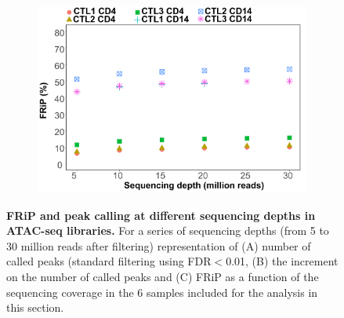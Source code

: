 \begin{figure}[htbp]
\begin{subfigure}{0.45\textwidth}
\includegraphics[width=\textwidth]{./Results1/pdfs/ATAC_Core_fresh_CD4_CD14_frac_reads_in_peaks_vs_depth}
\caption{\textbf{}}
\end{subfigure}
\caption[FRiP and peak calling at different sequencing depths in ATAC-seq libraries.]{\textbf{FRiP and peak calling at different sequencing depths in ATAC-seq libraries.} For a series of sequencing depths (from 5 to 30 million reads after filtering) representation of (A) number of called peaks (standard filtering using FDR$<$0.01, (B) the increment on the number of called peaks and (C) FRiP as a function of the sequencing coverage in the 6 samples included for the analysis in this section.}
\label{figure:Peak_calling_versus_depth_ATAC}
\end{figure} 



